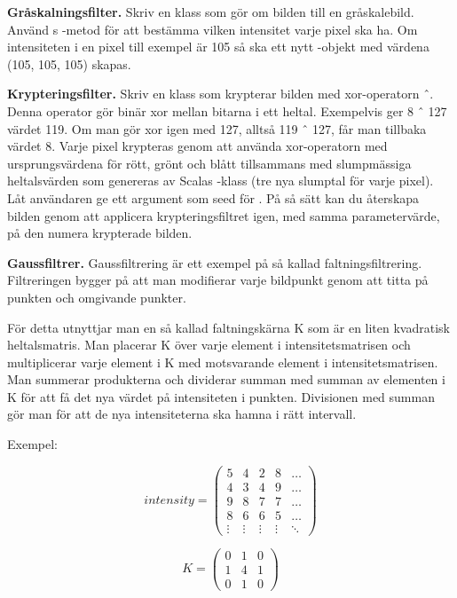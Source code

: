 \Task \textbf{Gråskalningsfilter.} Skriv en klass  som gör om bilden till en gråskalebild. Använd s -metod för att bestämma vilken intensitet varje pixel ska ha. Om intensiteten i en pixel till exempel är 105 så ska ett nytt -objekt med värdena (105, 105, 105) skapas.

\Task \textbf{Krypteringsfilter.} Skriv en klass  som krypterar bilden med xor-operatorn ˆ. Denna operator gör binär xor mellan bitarna i ett heltal. Exempelvis ger 8 ˆ 127 värdet 119. Om man gör xor igen med 127, alltså 119 ˆ 127, får man tillbaka värdet 8. Varje pixel krypteras genom att använda xor-operatorn med ursprungsvärdena för rött, grönt och blått tillsammans med slumpmässiga heltalsvärden som genereras av Scalas -klass (tre nya slumptal för varje pixel). Låt användaren ge ett argument som seed för . På så sätt kan du återskapa bilden genom att applicera krypteringsfiltret igen, med samma parametervärde, på den numera krypterade bilden.

\Task \textbf{Gaussfiltrer.} Gaussfiltrering är ett exempel på så kallad faltningsfiltrering. Filtreringen bygger på att man modifierar varje bildpunkt genom att titta på punkten och omgivande punkter.

För detta utnyttjar man en så kallad faltningskärna K som är en liten kvadratisk heltalsmatris. Man placerar K över varje element i intensitetsmatrisen och multiplicerar varje element i K med motsvarande element i intensitetsmatrisen. Man summerar produkterna och dividerar summan med summan av elementen i K för att få det nya värdet på intensiteten i punkten. Divisionen med summan gör man för att de nya intensiteterna ska hamna i rätt intervall.

Exempel:

\begin{minipage}{5cm}
\begin{displaymath}
\mathit{intensity} = \left(
\begin{array}{ccccc}
5 & 4 & 2 & 8 & \ldots \\
4 & 3 & 4 & 9 & \ldots \\
9 & 8 & 7 & 7 & \ldots \\
8 & 6 & 6 & 5 & \ldots \\
\vdots & \vdots & \vdots & \vdots & \ddots
\end{array}
\right)
\end{displaymath}
\end{minipage}\hspace{2cm}
\begin{minipage}{5cm}
\begin{displaymath}
K = \left(
\begin{array}{ccc}
0 & 1 & 0 \\
1 & 4 & 1 \\
0 & 1 & 0
\end{array}
\right)
\end{displaymath}
\end{minipage}

